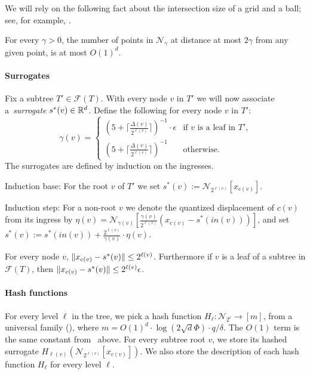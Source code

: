 We will rely on the following fact about the intersection size of a grid and a ball; see, for example, \cite{har2012approximate}.

\begin{claim}\label{clm:gridball}
For every $\gamma>0$, the number of points  in $\mathcal N_\gamma$ at distance at most $2\gamma$ from any given point, is at most $O(1)^d$.
\end{claim}


\paragraph{Surrogates}
Fix a subtree $T'\in\mathcal F(T)$. With every node $v$ in $T'$ we will now associate a~\emph{surrogate} $s^*(v)\in\mathbb R^d$.
Define the following for every node $v$ in $T'$:
\[
  \gamma(v) = 
  \begin{cases}
  \left(5 + \lceil\frac{\Delta(v)}{2^{\ell(v)}}\rceil\right)^{-1}\cdot\epsilon & \text{if $v$ is a leaf in $T'$,}\\
  \left(5 + \lceil\frac{\Delta(v)}{2^{\ell(v)}}\rceil\right)^{-1} & \text{otherwise.}
  \end{cases}
\]
The surrogates are defined by induction on the ingresses.

Induction base: For the root $v$ of $T'$ we set $s^*(v) := \mathcal N_{2^{\ell(v)}}[x_{c(v)}]$.

Induction step: For a non-root $v$ we denote the quantized displacement of $c(v)$ from its ingress by $\eta(v)=\mathcal N_{\gamma(v)}\left[\frac{\gamma(v)}{2^{\ell(v)}}(x_{c(v)}-s^*(in(v)))\right]$, and set
$s^*(v) := s^*(in(v)) + \frac{2^{\ell(v)}}{\gamma(v)}\cdot\eta(v)$.

\begin{lemma}\label{lmm:surrogates}
For every node $v$, $\lVert x_{c(v)}-s^*(v)\rVert\leq2^{\ell(v)}$.
Furthermore if $v$ is a leaf of a subtree in $\mathcal F(T)$, then $\lVert x_{c(v)}-s^*(v)\rVert\leq2^{\ell(v)}\epsilon$.
\end{lemma}

\paragraph{Hash functions}
For every level $\ell$ in the tree, we pick a hash function $H_\ell:\mathcal N_{2^\ell}\rightarrow[m]$, from a universal family (\cite{carter1979universal}), where $m=O(1)^d\cdot\log(2\sqrt d\Phi)\cdot q/\delta$.
The $O(1)$ term is the same constant from~ above.
For every subtree root $v$, we store its hashed surrogate $H_{\ell(v)}(\mathcal N_{2^{\ell(v)}}[x_{c(v)}])$.
We also store the description of each hash function $H_\ell$ for every level $\ell$.

